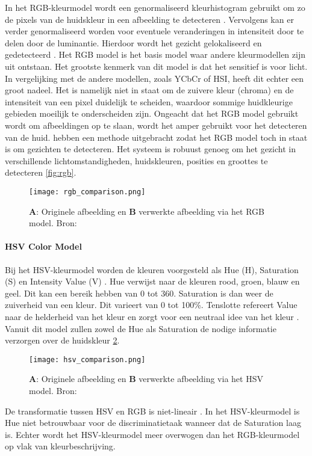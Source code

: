 In het RGB-kleurmodel wordt een genormaliseerd kleurhistogram gebruikt om zo de pixels van de huidskleur in een afbeelding te detecteren \autocite{Kumar2019}. Vervolgens kan er verder genormaliseerd worden voor eventuele veranderingen in intensiteit door te delen door de luminantie. Hierdoor wordt het gezicht gelokaliseerd en gedetecteerd \autocite{Subban2012}. Het RGB model is het basis model waar andere kleurmodellen zijn uit ontstaan. Het grootste kenmerk van dit model is dat het sensitief is voor licht. In vergelijking met de andere modellen, zoals YCbCr of HSI, heeft dit echter een groot nadeel. Het is namelijk niet in staat om de zuivere kleur (chroma) en de intensiteit van een pixel duidelijk te scheiden, waardoor sommige huidkleurige gebieden moeilijk te onderscheiden zijn. Ongeacht dat het RGB model gebruikt wordt om afbeeldingen op te slaan, wordt het amper gebruikt voor het detecteren van de huid. \textcite{dhivakar2015} hebben een methode uitgebracht zodat het RGB model toch in staat is om gezichten te detecteren. Het systeem is robuust genoeg om het gezicht in verschillende lichtomstandigheden, huidskleuren, posities en groottes te detecteren \ref{fig:rgb}.  
\begin{figure}[htbp]
    \centering
    \texttt{[image: rgb\_comparison.png]}
    \caption{\textbf{A}: Originele afbeelding en \textbf{B} verwerkte afbeelding via het RGB model. Bron: \autocite{Kumar2019}}
    \label{fig:rgbref}
\end{figure}
\paragraph{HSV Color Model}
Bij het HSV-kleurmodel worden de kleuren voorgesteld als Hue (H), Saturation (S) en Intensity Value (V) \autocite{Kumar2019}. Hue verwijst naar de kleuren rood, groen, blauw en geel. Dit kan een bereik hebben van 0 tot 360. Saturation is dan weer de zuiverheid  van een kleur. Dit varieert van 0 tot 100\%. Tenslotte refereert Value naar de helderheid van het kleur en zorgt voor een neutraal idee van het kleur \autocite{Hashem2009}. Vanuit dit model zullen zowel de Hue als Saturation de nodige informatie verzorgen over de huidskleur \ref{fig:hsvref}. 
\begin{figure}[htbp]
    \centering
    \texttt{[image: hsv\_comparison.png]}
    \caption{\textbf{A}: Originele afbeelding en \textbf{B} verwerkte afbeelding via het HSV model. Bron: \autocite{Kumar2019}}
    \label{fig:hsvref}
\end{figure}
De transformatie tussen HSV en RGB is niet-lineair \autocite{crowley1996}. In het HSV-kleurmodel is Hue niet betrouwbaar voor de discriminatietaak wanneer dat de Saturation laag is. Echter wordt het HSV-kleurmodel meer overwogen dan het RGB-kleurmodel op vlak van kleurbeschrijving.


